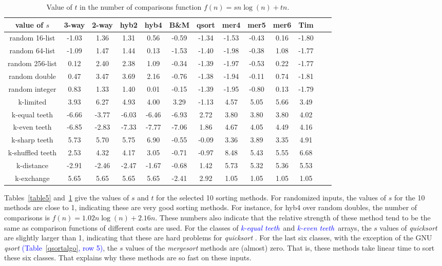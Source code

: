 \documentclass[AMA,STIX1COL]{WileyNJD-v2}
\newcommand{\keq}{\textcolor{blue}{\emph{k-equal teeth}}}
\newcommand{\kev}{\textcolor{blue}{\emph{k-even teeth}}}
\newcommand{\qusort}{\emph{quicksort }}
\newcommand{\qsort}{\emph{qsort }}
\newcommand{\msort}{\emph{mergesort }}
\begin{document}
\begin{table}
\caption{Value of $t$ in the number of comparisons function $f(n) = sn\log(n) + tn$.}
\centering
\begin{tabular}{|c|c|c|c|c|c|c|c|c|c|c|c|c|}
\toprule
value of $s$ & 3-way & 2-way & hyb2 & hyb4 & B\&M& qsort & mer4 & mer5 & mer6 & Tim \\
\midrule
random 16-list	&-1.03	&1.36	&1.31	&0.56	&-0.59	&-1.34	&-1.53	&-0.43	&0.16&	-1.80\\
random 64-list&-1.09&	1.47&	1.44&	0.13&	-1.53&	-1.40&	-1.98&	-0.38&	1.08&	-1.77\\
random 256-list&0.12	&2.40	&2.38	&1.09	&-0.34	&-1.39	&-1.97	&-0.53	&0.22	&-1.77\\
random double&0.47&	 3.47&	 3.69& 	2.16&	-0.76	 &-1.38&	-1.94&	-0.11&	0.74&	-1.81\\
random integer&0.83& 	1.33&	1.40&	0.01&	-0.15&	-1.39&	-1.95&	-0.80&	0.13&	-1.79\\
k-limited&	3.93	&6.27	&4.93	&4.00	&3.29	&-1.13	&4.57	&5.05	&5.66	&3.49\\
k-equal teeth&	-6.66	& -3.77&	-6.03&	-6.46&	-6.93&	2.72&	3.80&	3.80&	3.80&	4.02\\
k-even teeth&	-6.85	& -2.83	 &-7.33	&-7.77	&-7.06	&1.86	&4.67	&4.05	&4.49	&4.16\\
k-sharp teeth&	5.73	&5.70&	5.75&	6.90&	-0.55&	-0.09&	3.36&	3.89&	3.35&	4.91\\
k-shuffled teeth&2.53	&4.32	&4.17	&3.05	&-0.71	&-0.97	&8.48	&5.43	&5.55	&6.68\\
k-distance&-2.91&	-2.46&	-2.47&	-1.67&	-0.68&	1.42&	5.73&	5.32&	5.36&	5.53\\
k-exchange&	5.65	&5.65	&5.65	&5.65	&-2.41	&2.92	&1.05	&1.05	&1.05	&1.05\\
\bottomrule
\end{tabular}
\label{table6}
\end{table}

Tables~\ref{table5} and~\ref{table6} give the values of $s$ and $t$ for the selected 10 sorting methods. 
For randomized inputs, the values of $s$ for the 10 methods are close to 1, indicating these are very good sorting methods. 
For instance, for hyb4 over random doubles, the number of comparisons is $f(n) = 1.02n\log(n) + 2.16n$. 
These numbers also indicate that the relative strength of these method tend to be the same as comparison functions of different costs are used. 
For the classes of \keq\ and \kev\ arrays, the $s$ values of \qusort are slightly larger than 1, indicating that these are hard problems for \qusort. 
For the last six classes, with the exception of the GNU \qsort \textcolor{blue}{(Table~\ref{qsortalgo}, row 5)}, the $s$ values of the \msort methods are (almost) zero. 
That is, these methods take linear time to sort these six classes.  
That explains why these methods are so fast on these inputs.
\end{document}
